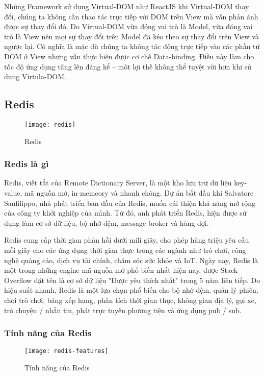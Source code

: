 Những Framework sử dụng Virtual-DOM như ReactJS khi Virtual-DOM thay đổi, chúng ta không cần thao tác trực tiếp với DOM trên View mà vẫn phản ánh được sự thay đổi đó. Do Virtual-DOM vừa đóng vai trò là Model, vừa đóng vai trò là View nên mọi sự thay đổi trên Model đã kéo theo sự thay đổi trên View và ngược lại. Có nghĩa là mặc dù chúng ta không tác động trực tiếp vào các phần tử DOM ở View nhưng vẫn thực hiện được cơ chế Data-binding. Điều này làm cho tốc độ ứng dụng tăng lên đáng kể – môt lợi thế không thể tuyệt vời hơn khi sử dụng Virtula-DOM.

\subsection{Redis}

\begin{figure}[H]
	\centering
	\texttt{[image: redis]}
	\caption{Redis}
\end{figure}

\subsubsection{Redis là gì}

Redis, viết tắt của Remote Dictionary Server, là một kho lưu trữ dữ liệu key-value, mã nguồn mở, in-memeory và nhanh chóng. Dự án bắt đầu khi Salvatore Sanfilippo, nhà phát triển ban đầu của Redis, muốn cải thiện khả năng mở rộng của công ty khởi nghiệp của mình. Từ đó, anh phát triển Redis, hiện được sử dụng làm cơ sở dữ liệu, bộ nhớ đệm, message broker và hàng đợi.

Redis cung cấp thời gian phản hồi dưới mili giây, cho phép hàng triệu yêu cầu mỗi giây cho các ứng dụng thời gian thực trong các ngành như trò chơi, công nghệ quảng cáo, dịch vụ tài chính, chăm sóc sức khỏe và IoT. Ngày nay, Redis là một trong những engine mã nguồn mở phổ biến nhất hiện nay, được Stack Overflow đặt tên là cơ sở dữ liệu "Được yêu thích nhất" trong 5 năm liên tiếp. Do hiệu suất nhanh, Redis là một lựa chọn phổ biến cho bộ nhớ đệm, quản lý phiên, chơi trò chơi, bảng xếp hạng, phân tích thời gian thực, không gian địa lý, gọi xe, trò chuyện / nhắn tin, phát trực tuyến phương tiện và ứng dụng pub / sub.

\subsubsection{Tính năng của Redis}

\begin{figure}[H]
	\centering
	\texttt{[image: redis-features]}
	\caption{Tính năng của Redis}
\end{figure}

